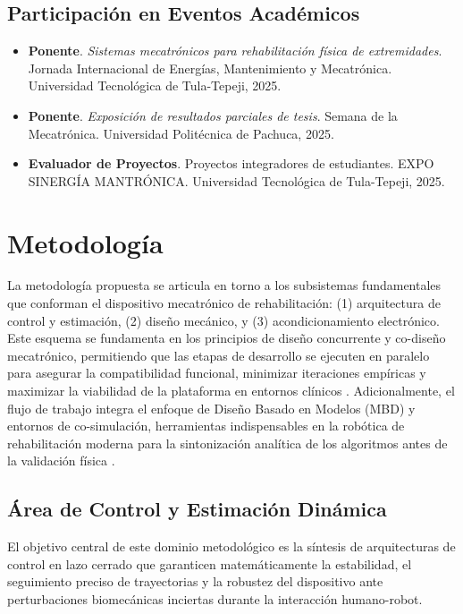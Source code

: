 \documentclass[a4paper,12pt]{article}
\begin{document}
\subsection{Participación en Eventos Académicos}
\begin{itemize}
    \item \textbf{Ponente}. \textit{Sistemas mecatrónicos para rehabilitación física de extremidades}. Jornada Internacional de Energías, Mantenimiento y Mecatrónica. Universidad Tecnológica de Tula-Tepeji, 2025.

    \item \textbf{Ponente}. \textit{Exposición de resultados parciales de tesis}. Semana de la Mecatrónica. Universidad Politécnica de Pachuca, 2025.

    \item \textbf{Evaluador de Proyectos}. Proyectos integradores de estudiantes. EXPO SINERGÍA MANTRÓNICA. Universidad Tecnológica de Tula-Tepeji, 2025.
\end{itemize}


\newpage

\section{Metodología}

La metodología propuesta se articula en torno a los subsistemas fundamentales que conforman el dispositivo mecatrónico de rehabilitación: (1) arquitectura de control y estimación, (2) diseño mecánico, y (3) acondicionamiento electrónico. Este esquema se fundamenta en los principios de diseño concurrente y co-diseño mecatrónico, permitiendo que las etapas de desarrollo se ejecuten en paralelo para asegurar la compatibilidad funcional, minimizar iteraciones empíricas y maximizar la viabilidad de la plataforma en entornos clínicos \citep{chhabra_holistic_2009, park_concurrent_2001, cruz_methodology_2017}. Adicionalmente, el flujo de trabajo integra el enfoque de Diseño Basado en Modelos (MBD) y entornos de co-simulación, herramientas indispensables en la robótica de rehabilitación moderna para la sintonización analítica de los algoritmos antes de la validación física \citep{gil_model-based_2025, mazumder_next_2023}.

\subsection{Área de Control y Estimación Dinámica}

El objetivo central de este dominio metodológico es la síntesis de arquitecturas de control en lazo cerrado que garanticen matemáticamente la estabilidad, el seguimiento preciso de trayectorias y la robustez del dispositivo ante perturbaciones biomecánicas inciertas durante la interacción humano-robot.
\end{document}
